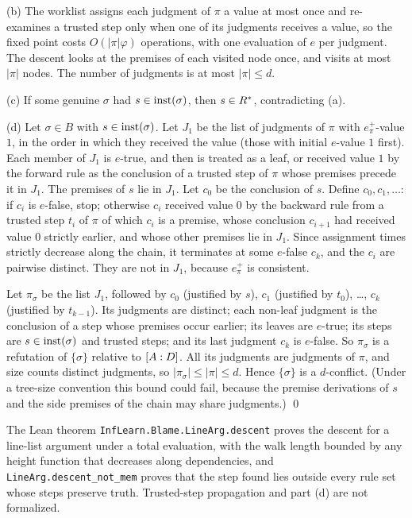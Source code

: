 (b) The worklist assigns each judgment of $\pi$ a value at most once and re-examines a trusted step only when one of its judgments receives a value, so the fixed point costs $O(|\pi|\varphi)$ operations, with one evaluation of $e$ per judgment. The descent looks at the premises of each visited node once, and visits at most $|\pi|$ nodes. The number of judgments is at most $|\pi|\le d$.

(c) If some genuine $\sigma$ had $s\in\mathrm{inst}(\sigma)$, then $s\in R^{*}$, contradicting (a).

(d) Let $\sigma\in B$ with $s\in\mathrm{inst}(\sigma)$. Let $J_1$ be the list of judgments of $\pi$ with $e^+_\pi$-value $1$, in the order in which they received the value (those with initial $e$-value $1$ first). Each member of $J_1$ is $e$-true, and then is treated as a leaf, or received value $1$ by the forward rule as the conclusion of a trusted step of $\pi$ whose premises precede it in $J_1$. The premises of $s$ lie in $J_1$. Let $c_0$ be the conclusion of $s$. Define $c_0,c_1,\dots$: if $c_i$ is $e$-false, stop; otherwise $c_i$ received value $0$ by the backward rule from a trusted step $t_i$ of $\pi$ of which $c_i$ is a premise, whose conclusion $c_{i+1}$ had received value $0$ strictly earlier, and whose other premises lie in $J_1$. Since assignment times strictly decrease along the chain, it terminates at some $e$-false $c_k$, and the $c_i$ are pairwise distinct. They are not in $J_1$, because $e^+_\pi$ is consistent.

Let $\pi_\sigma$ be the list $J_1$, followed by $c_0$ (justified by $s$), $c_1$ (justified by $t_0$), \dots, $c_k$ (justified by $t_{k-1}$). Its judgments are distinct; each non-leaf judgment is the conclusion of a step whose premises occur earlier; its leaves are $e$-true; its steps are $s\in\mathrm{inst}(\sigma)$ and trusted steps; and its last judgment $c_k$ is $e$-false. So $\pi_\sigma$ is a refutation of $\{\sigma\}$ relative to $[A : D]$. All its judgments are judgments of $\pi$, and size counts distinct judgments, so $|\pi_\sigma|\le|\pi|\le d$. Hence $\{\sigma\}$ is a $d$-conflict. (Under a tree-size convention this bound could fail, because the premise derivations of $s$ and the side premises of the chain may share judgments.) \qed

The Lean theorem \texttt{InfLearn.Blame.LineArg.descent} proves the descent for a line-list argument under a total evaluation, with the walk length bounded by any height function that decreases along dependencies, and \texttt{LineArg.descent\_not\_mem} proves that the step found lies outside every rule set whose steps preserve truth. Trusted-step propagation and part (d) are not formalized.

